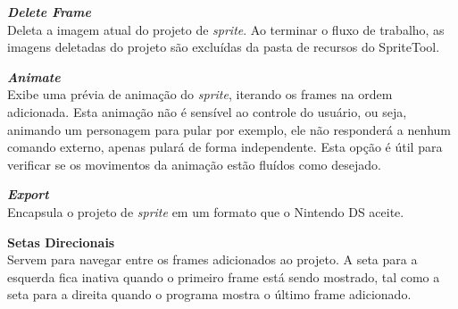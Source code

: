\documentclass[brazil]{abnt}
\begin{document}
\textbf{\textit{Delete Frame}}\\
Deleta a imagem atual do projeto de \textit{sprite}. Ao terminar o fluxo de trabalho, as imagens deletadas do projeto são excluídas da pasta de recursos do SpriteTool.

\textbf{\textit{Animate}}\\
Exibe uma prévia de animação do \textit{sprite}, iterando os frames na ordem adicionada. Esta animação não é sensível ao controle do usuário, ou seja, animando um personagem para pular por exemplo, ele não responderá a nenhum comando externo, apenas pulará de forma independente. Esta opção é útil para verificar se os movimentos da animação estão fluídos como desejado.

\textbf{\textit{Export}}\\
Encapsula o projeto de \textit{sprite} em um formato que o Nintendo DS aceite.

\textbf{Setas Direcionais}\\
Servem para navegar entre os frames adicionados ao projeto. A seta para a esquerda fica inativa quando o primeiro frame está sendo mostrado, tal como a seta para a direita quando o programa mostra o último frame adicionado.
\end{document}
